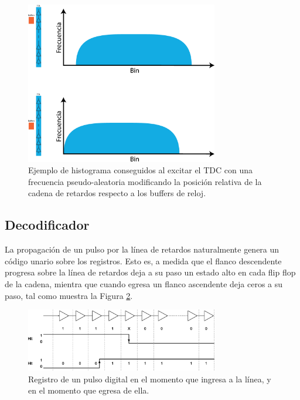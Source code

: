 \begin{figure}[H]
     \centering
     \includegraphics[width=0.75\textwidth]{imagenes/problema_buffer.eps}
     \caption{Ejemplo de histograma conseguidos al excitar el TDC con una frecuencia pseudo-aleatoria 
     modificando la posición relativa de la cadena de retardos respecto a los buffers de reloj.}
     \label{fig: problema buffer}
\end{figure}

\subsection{Decodificador}
La propagación de un pulso por la línea de retardos naturalmente genera un código unario sobre los 
registros. Esto es, a medida que el flanco descendente progresa sobre la línea de retardos deja a 
su paso un estado alto en cada flip flop de la cadena, mientra que cuando egresa un flanco ascendente 
deja ceros a su paso, tal como muestra la Figura \ref{fig: tdl_flancos}.

\begin{figure}[H]
     \centering
     \includegraphics[width=0.75\textwidth]{imagenes/tdl_flancos.eps}
     \caption{Registro de un pulso digital en el momento que ingresa a la línea, y en el momento
     que egresa de ella.}
     \label{fig: tdl_flancos}
\end{figure}


